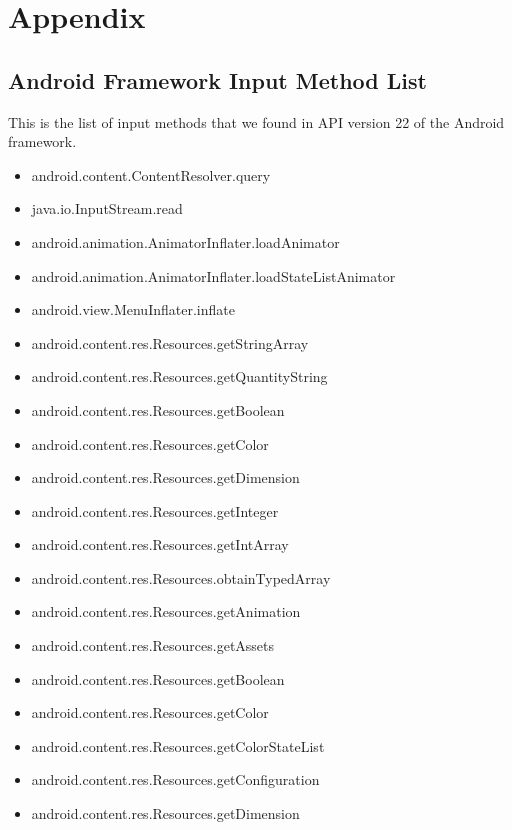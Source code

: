 \documentclass{sig-alternate}
\begin{document}



\onecolumn

\section{Appendix}

\subsection{Android Framework Input Method List}

This is the list of input methods that we found in API version 22 of the Android framework.

\begin{itemize}
  
\item android.content.ContentResolver.query
\item java.io.InputStream.read
\item android.animation.AnimatorInflater.loadAnimator
\item android.animation.AnimatorInflater.loadStateListAnimator
\item android.view.MenuInflater.inflate
\item android.content.res.Resources.getStringArray
\item android.content.res.Resources.getQuantityString
\item android.content.res.Resources.getBoolean
\item android.content.res.Resources.getColor
\item android.content.res.Resources.getDimension
\item android.content.res.Resources.getInteger
\item android.content.res.Resources.getIntArray
\item android.content.res.Resources.obtainTypedArray
\item android.content.res.Resources.getAnimation
\item android.content.res.Resources.getAssets
\item android.content.res.Resources.getBoolean
\item android.content.res.Resources.getColor
\item android.content.res.Resources.getColorStateList
\item android.content.res.Resources.getConfiguration
\item android.content.res.Resources.getDimension

\end{itemize}
\end{document}
